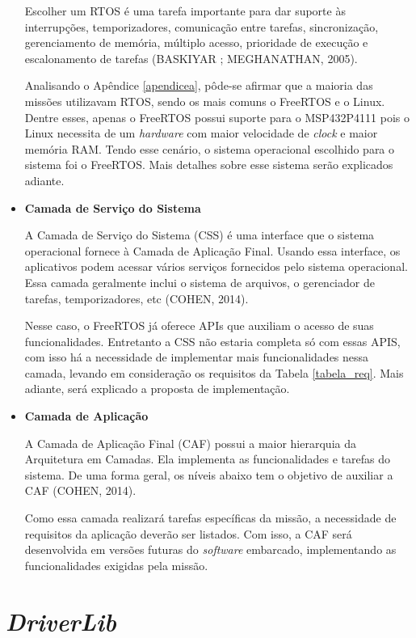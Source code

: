 \begin{itemize}
	Escolher um RTOS é uma tarefa importante para dar suporte às interrupções, temporizadores, comunicação entre tarefas, sincronização, gerenciamento de memória, múltiplo acesso, prioridade de execução e escalonamento de tarefas (BASKIYAR ; MEGHANATHAN, 2005).
	
	Analisando o Apêndice \ref{apendicea}, pôde-se afirmar que a maioria das missões utilizavam RTOS, sendo os mais comuns o FreeRTOS e o Linux. Dentre esses, apenas o FreeRTOS possui suporte para o MSP432P4111 pois o Linux necessita de um \textit{hardware} com maior velocidade de \textit{clock} e maior memória RAM. Tendo esse cenário, o sistema operacional escolhido para o sistema foi o FreeRTOS. Mais detalhes sobre esse sistema serão explicados adiante. 
	
	\item \textbf{Camada de Serviço do Sistema}
	
	A Camada de Serviço do Sistema (CSS) é uma interface que o sistema operacional fornece à Camada de Aplicação Final. Usando essa interface, os aplicativos podem acessar vários serviços fornecidos pelo sistema operacional. Essa camada geralmente inclui o sistema de arquivos, o gerenciador de tarefas, temporizadores, etc (COHEN, 2014).
	
	Nesse caso, o FreeRTOS já oferece APIs que auxiliam o acesso de suas funcionalidades. Entretanto a CSS não estaria completa só com essas APIS, com isso há a necessidade de implementar mais funcionalidades nessa camada, levando em consideração os requisitos da Tabela \ref{tabela_req}. Mais adiante, será explicado a proposta de implementação.
	
	
	\item \textbf{Camada de Aplicação}
	
	A Camada de Aplicação Final (CAF) possui a maior hierarquia da Arquitetura em Camadas. Ela implementa as funcionalidades e tarefas do sistema. De uma forma geral, os níveis abaixo tem o objetivo de auxiliar a CAF (COHEN, 2014).
	
	Como essa camada realizará tarefas específicas da missão, a necessidade de requisitos da aplicação deverão ser listados. Com isso, a CAF será desenvolvida em versões futuras do \textit{software} embarcado, implementando as funcionalidades exigidas pela missão.
	
	
	
\end{itemize}

\section{\textit{DriverLib}}

